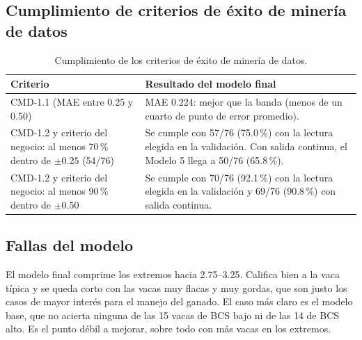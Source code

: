 \subsection{Cumplimiento de criterios de éxito de minería de datos}

\begin{table}[H]
  \centering
  \small
  \caption{Cumplimiento de los criterios de éxito de minería de datos.}
  \label{tab:criterios}
  \begin{tabularx}{\textwidth}{>{\raggedright\arraybackslash}p{}>{\raggedright\arraybackslash}X}
    \toprule
    Criterio & Resultado del modelo final \\
    \midrule
    CMD-1.1 (MAE entre 0.25 y 0.50) & MAE 0.224: mejor que la banda (menos de un cuarto de punto de error promedio). \\
    \addlinespace
    CMD-1.2 y criterio del negocio: al menos 70\,\% dentro de $\pm0.25$ (54/76) & Se cumple con 57/76 (75.0\,\%) con la lectura elegida en la validación. Con salida continua, el Modelo 5 llega a 50/76 (65.8\,\%). \\
    \addlinespace
    CMD-1.2 y criterio del negocio: al menos 90\,\% dentro de $\pm0.50$ & Se cumple con 70/76 (92.1\,\%) con la lectura elegida en la validación y 69/76 (90.8\,\%) con salida continua. \\
    \bottomrule
  \end{tabularx}
\end{table}

\subsection{Fallas del modelo}

El modelo final comprime los extremos hacia 2.75--3.25. Califica bien a la vaca típica y se queda corto con las vacas muy flacas y muy gordas, que son justo los casos de mayor interés para el manejo del ganado. El caso más claro es el modelo base, que no acierta ninguna de las 15 vacas de BCS bajo ni de las 14 de BCS alto. Es el punto débil a mejorar, sobre todo con más vacas en los extremos.
